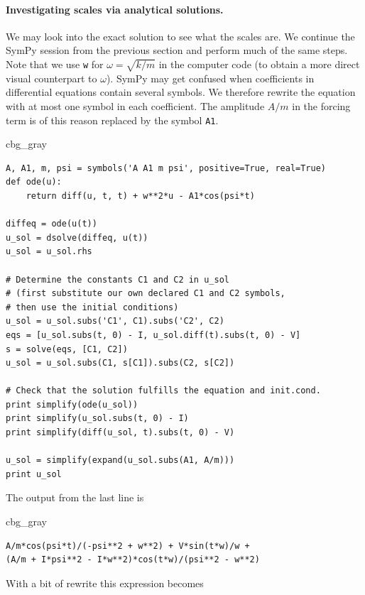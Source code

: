 \documentclass[graybox,envcountchap,sectrefs,final]{svmonodo}
\newenvironment{_cod_tight}[1]{
   \def\FrameCommand{\colorbox{#1}}
   \FrameRule0.6pt\MakeFramed {\FrameRestore}\vskip3mm}
   {\vskip0mm\endMakeFramed}
\newenvironment{cod}[1]{
\bgroup\rmfamily
\fboxsep=0mm\relax
\begin{_cod_tight}{#1}
\list{}{\parsep=-2mm\parskip=0mm\topsep=0pt\leftmargin=2mm
\rightmargin=2\leftmargin\leftmargin=4pt\relax}
\item\relax}
{\endlist\end{_cod_tight}\egroup}
\begin{document}
\paragraph{Investigating scales via analytical solutions.}
We may look into the exact solution to see what the scales are.  We
continue the SymPy session from the previous section and perform much
of the same steps. Note that we use \texttt{w} for $\omega = \sqrt{k/m}$
in the computer code (to obtain a more direct visual counterpart to
$\omega$).
SymPy may get confused when coefficients in differential equations
contain several symbols. We therefore rewrite the equation with
at most one symbol in each coefficient.
The amplitude $A/m$ in the forcing term is of this reason
replaced by the symbol \texttt{A1}.

\begin{cod}{cbg_gray}\begin{Verbatim}[numbers=none,fontsize=\fontsize{9pt}{9pt},baselinestretch=0.95,xleftmargin=2mm]
A, A1, m, psi = symbols('A A1 m psi', positive=True, real=True)
def ode(u):
    return diff(u, t, t) + w**2*u - A1*cos(psi*t)

diffeq = ode(u(t))
u_sol = dsolve(diffeq, u(t))
u_sol = u_sol.rhs

# Determine the constants C1 and C2 in u_sol
# (first substitute our own declared C1 and C2 symbols,
# then use the initial conditions)
u_sol = u_sol.subs('C1', C1).subs('C2', C2)
eqs = [u_sol.subs(t, 0) - I, u_sol.diff(t).subs(t, 0) - V]
s = solve(eqs, [C1, C2])
u_sol = u_sol.subs(C1, s[C1]).subs(C2, s[C2])

# Check that the solution fulfills the equation and init.cond.
print simplify(ode(u_sol))
print simplify(u_sol.subs(t, 0) - I)
print simplify(diff(u_sol, t).subs(t, 0) - V)

u_sol = simplify(expand(u_sol.subs(A1, A/m)))
print u_sol
\end{Verbatim}
\end{cod}
\noindent
The output from the last line is

\begin{cod}{cbg_gray}\begin{Verbatim}[numbers=none,fontsize=\fontsize{9pt}{9pt},baselinestretch=0.95,xleftmargin=2mm]
A/m*cos(psi*t)/(-psi**2 + w**2) + V*sin(t*w)/w +
(A/m + I*psi**2 - I*w**2)*cos(t*w)/(psi**2 - w**2)
\end{Verbatim}
\end{cod}
\noindent
With a bit of rewrite this expression becomes

\end{document}
